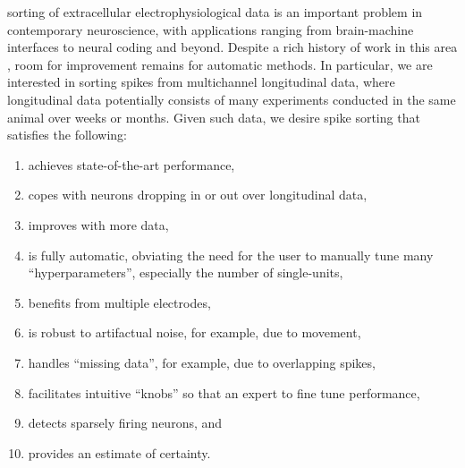 \documentclass[journal]{IEEEtran}
\begin{document}
 sorting of extracellular electrophysiological data is an important problem in contemporary neuroscience, with applications ranging from brain-machine interfaces \cite{Nicolelis2009} to neural coding \cite{Rieke1997} and beyond.  Despite a rich history of work in this area \cite{Wheeler1991, Einevoll2012}, room for improvement remains for automatic methods. In particular, we are interested in sorting spikes from multichannel longitudinal data, where longitudinal data potentially consists of many experiments conducted in the same animal over weeks or months.  Given such data, we desire spike sorting that satisfies the following:
\begin{enumerate} 
	\item achieves state-of-the-art performance,
	\item copes with neurons dropping in or out over longitudinal data,
	\item improves with more data, 
	\item is fully automatic, obviating the need for the user to manually tune many ``hyperparameters'', especially the number of single-units,
	\item benefits from multiple electrodes,
	\item is robust to artifactual noise, for example, due to movement, 
	\item handles ``missing data'', for example, due to overlapping spikes, 
	\item facilitates intuitive ``knobs'' so that an expert to fine tune performance, 
	\item detects sparsely firing neurons, and
	\item provides an estimate of certainty.
\end{enumerate}
\end{document}
